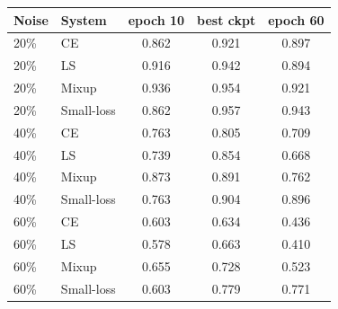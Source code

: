 \begin{tabular}{llccc}
\toprule
Noise & System & epoch 10 & best ckpt & epoch 60 \\
\midrule
20\% & CE & 0.862 & 0.921 & 0.897 \\
20\% & LS & 0.916 & 0.942 & 0.894 \\
20\% & Mixup & 0.936 & 0.954 & 0.921 \\
20\% & Small-loss & 0.862 & 0.957 & 0.943 \\
\midrule
40\% & CE & 0.763 & 0.805 & 0.709 \\
40\% & LS & 0.739 & 0.854 & 0.668 \\
40\% & Mixup & 0.873 & 0.891 & 0.762 \\
40\% & Small-loss & 0.763 & 0.904 & 0.896 \\
\midrule
60\% & CE & 0.603 & 0.634 & 0.436 \\
60\% & LS & 0.578 & 0.663 & 0.410 \\
60\% & Mixup & 0.655 & 0.728 & 0.523 \\
60\% & Small-loss & 0.603 & 0.779 & 0.771 \\
\bottomrule
\end{tabular}
